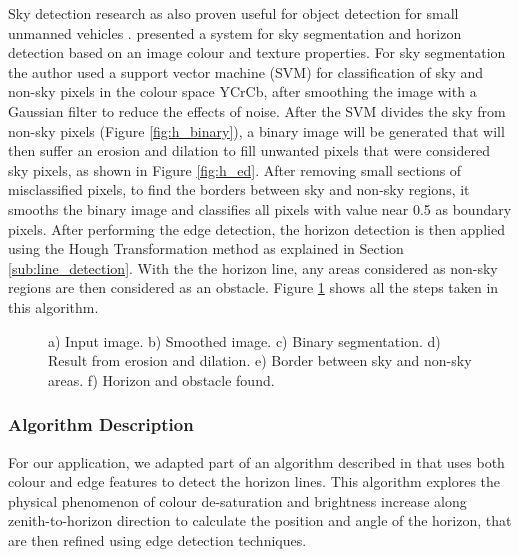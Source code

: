 Sky detection research as also proven useful for object detection for small unmanned vehicles \cite{mcgee2005obstacle}. \citeauthor{mcgee2005obstacle} \cite{mcgee2005obstacle} presented a system for sky segmentation and horizon detection based on an image colour and texture properties.
For sky segmentation the author used a support vector machine (SVM) for classification of sky and non-sky pixels in the colour space YCrCb, after smoothing the image with a Gaussian filter to reduce the effects of noise. After the SVM divides the sky from non-sky pixels (Figure \ref{fig:h_binary}), a binary image will be generated that will then suffer an erosion and dilation to fill unwanted pixels that were considered sky pixels, as shown in Figure \ref{fig:h_ed}. After removing small sections of misclassified pixels, to find the borders between sky and non-sky regions, it smooths the binary image and classifies all pixels with value near 0.5 as boundary pixels. After performing the edge detection, the horizon detection is then applied using the Hough Transformation method as explained in Section \ref{sub:line_detection}. With the the horizon line, any areas considered as non-sky regions are then considered as an obstacle. Figure \ref{fig:horizon} shows all the steps taken in this algorithm.
\begin{figure}[htbp]
	\centering
    \caption{a) Input image. b) Smoothed image. c) Binary segmentation. d) Result from erosion and dilation. e) Border between sky and non-sky areas. f) Horizon and obstacle found.}
    \label{fig:horizon}
\end{figure}

\subsubsection{Algorithm Description}
For our application, we adapted part of an algorithm described in \cite{zafarifar2008horizon} that uses both colour and edge features to detect the horizon lines. This algorithm explores the physical phenomenon of colour de-saturation and brightness increase along zenith-to-horizon direction to calculate the position and angle of the horizon, that are then refined using edge detection techniques.

